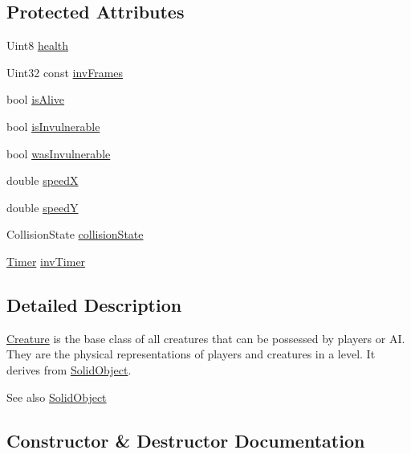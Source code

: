\subsection*{Protected Attributes}
\begin{DoxyCompactItemize}
\item 
Uint8 \hyperlink{class_creature_a312bc862a499a3955e74b5215d3bd1c5}{health}
\item 
Uint32 const \hyperlink{class_creature_a430d7d130b9a4466faf8850322831671}{inv\+Frames}
\item 
bool \hyperlink{class_creature_a346917307824f74d66ed73751c32f4a2}{is\+Alive}
\item 
bool \hyperlink{class_creature_a5aaf90f9ca19a84d1b66016df689a735}{is\+Invulnerable}
\item 
bool \hyperlink{class_creature_a344b50a9000c1ff0396c5d2ef771417e}{was\+Invulnerable}
\item 
double \hyperlink{class_creature_acc2fb7ea8dd1145c4f6c9d9dc26d200b}{speedX}
\item 
double \hyperlink{class_creature_a13a98588ff3cc78bb9c2e05da185a843}{speedY}
\item 
Collision\+State \hyperlink{class_creature_af39ddb6063b910255b0f9c5208a22762}{collision\+State}
\item 
\hyperlink{class_timer}{Timer} \hyperlink{class_creature_aeda246cf3c5e6025c91a02b72d4561ee}{inv\+Timer}
\end{DoxyCompactItemize}


\subsection{Detailed Description}
\hyperlink{class_creature}{Creature} is the base class of all creatures that can be possessed by players or AI. They are the physical representations of players and creatures in a level. It derives from \hyperlink{class_solid_object}{Solid\+Object}. \begin{DoxySeeAlso}{See also}
\hyperlink{class_solid_object}{Solid\+Object} 
\end{DoxySeeAlso}


\subsection{Constructor \& Destructor Documentation}
